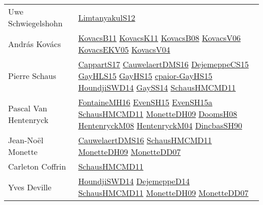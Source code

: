 {\begin{longtable}{p{4cm}p{15cm}}
Uwe Schwiegelshohn & \href{articles/LimtanyakulS12.pdf}{LimtanyakulS12}\cite{LimtanyakulS12} \\
Andr{\'{a}}s Kov{\'{a}}cs & \href{articles/KovacsB11.pdf}{KovacsB11}\cite{KovacsB11} \href{articles/KovacsK11.pdf}{KovacsK11}\cite{KovacsK11} \href{articles/KovacsB08.pdf}{KovacsB08}\cite{KovacsB08} \href{papers/KovacsV06.pdf}{KovacsV06}\cite{KovacsV06} \href{papers/KovacsEKV05.pdf}{KovacsEKV05}\cite{KovacsEKV05} \href{papers/KovacsV04.pdf}{KovacsV04}\cite{KovacsV04} \\
Pierre Schaus & \href{papers/CappartS17.pdf}{CappartS17}\cite{CappartS17} \href{papers/CauwelaertDMS16.pdf}{CauwelaertDMS16}\cite{CauwelaertDMS16} \href{papers/DejemeppeCS15.pdf}{DejemeppeCS15}\cite{DejemeppeCS15} \href{papers/GayHLS15.pdf}{GayHLS15}\cite{GayHLS15} \href{papers/GayHS15.pdf}{GayHS15}\cite{GayHS15} \href{papers/cpaior-GayHS15.pdf}{cpaior-GayHS15}\cite{cpaior-GayHS15} \href{papers/HoundjiSWD14.pdf}{HoundjiSWD14}\cite{HoundjiSWD14} \href{papers/GaySS14.pdf}{GaySS14}\cite{GaySS14} \href{articles/SchausHMCMD11.pdf}{SchausHMCMD11}\cite{SchausHMCMD11} \\
Pascal Van Hentenryck & \href{papers/FontaineMH16.pdf}{FontaineMH16}\cite{FontaineMH16} \href{papers/EvenSH15.pdf}{EvenSH15}\cite{EvenSH15} \href{articles/EvenSH15a.pdf}{EvenSH15a}\cite{EvenSH15a} \href{articles/SchausHMCMD11.pdf}{SchausHMCMD11}\cite{SchausHMCMD11} \href{papers/MonetteDH09.pdf}{MonetteDH09}\cite{MonetteDH09} \href{papers/DoomsH08.pdf}{DoomsH08}\cite{DoomsH08} \href{papers/HentenryckM08.pdf}{HentenryckM08}\cite{HentenryckM08} \href{papers/HentenryckM04.pdf}{HentenryckM04}\cite{HentenryckM04} \href{articles/DincbasSH90.pdf}{DincbasSH90}\cite{DincbasSH90} \\
Jean{-}No{\"{e}}l Monette & \href{papers/CauwelaertDMS16.pdf}{CauwelaertDMS16}\cite{CauwelaertDMS16} \href{articles/SchausHMCMD11.pdf}{SchausHMCMD11}\cite{SchausHMCMD11} \href{papers/MonetteDH09.pdf}{MonetteDH09}\cite{MonetteDH09} \href{papers/MonetteDD07.pdf}{MonetteDD07}\cite{MonetteDD07} \\
Carleton Coffrin & \href{articles/SchausHMCMD11.pdf}{SchausHMCMD11}\cite{SchausHMCMD11} \\
Yves Deville & \href{papers/HoundjiSWD14.pdf}{HoundjiSWD14}\cite{HoundjiSWD14} \href{papers/DejemeppeD14.pdf}{DejemeppeD14}\cite{DejemeppeD14} \href{articles/SchausHMCMD11.pdf}{SchausHMCMD11}\cite{SchausHMCMD11} \href{papers/MonetteDH09.pdf}{MonetteDH09}\cite{MonetteDH09} \href{papers/MonetteDD07.pdf}{MonetteDD07}\cite{MonetteDD07} \\

\end{longtable}}
